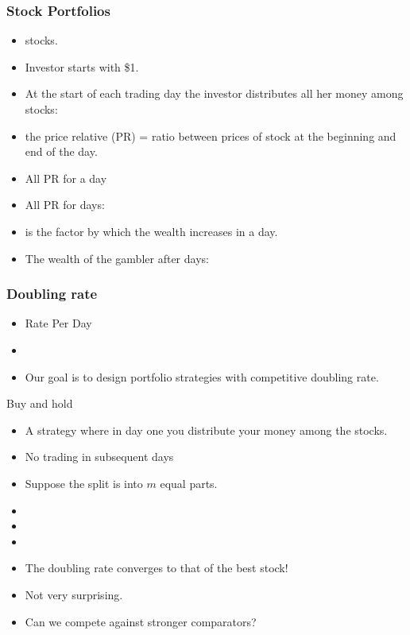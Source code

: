 \documentclass{beamer}
\begin{document}
\begin{small}
\begin{frame}[t]
  \frametitle{Stock Portfolios}
  \begin{itemize}
  \item {} stocks.
  \item Investor starts with \$1.
  \item At the start of each trading day the investor distributes all her money among   stocks:  
  \item {} the price relative (PR) = ratio between prices of stock  at the beginning and end of the day.
  \item All PR for a day 
  \item All PR for  days:  
  \item {}
    is the factor by which the wealth increases in a day. 
  \item The wealth of the gambler after  days:
    \R{\[
        S_n(\vx^n) = \prod_{j=1}^n \vb_j^T\vx_j^T 
      \]}
  \end{itemize}
\end{frame}

\begin{frame}
  \frametitle{Doubling rate}
  \begin{itemize}
    \item Rate Per Day
    \item {}
      \item Our goal is to design portfolio strategies with competitive doubling rate.
  \end{itemize}
\end{frame}

\begin{frame}{Buy and hold}
  \begin{itemize}
  \item A strategy where in day one you distribute your money among the stocks.
  \item No trading in subsequent days
    \item Suppose the split is into $m$ equal parts.
    \item {}
    \item {}
    \item {}
    \item The doubling rate converges to that of the best stock!
    \item Not very surprising.
      \item Can we compete against stronger comparators?
    \end{itemize}
\end{frame}




\end{small}
\end{document}
